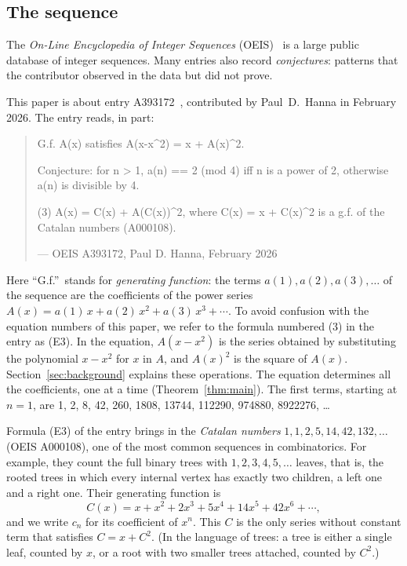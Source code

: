 \documentclass[11pt,a4paper]{article}
\theoremstyle{definition}
\theoremstyle{remark}
\begin{document}
\subsection{The sequence}\label{sec:sequence}
The \emph{On-Line Encyclopedia of Integer Sequences} (OEIS)~\cite{oeisdb} is a large public database of integer
sequences. Many
entries also record \emph{conjectures}: patterns that the contributor observed in the data but did not prove.

This paper is about entry A393172~\cite{oeis}, contributed by Paul~D.~Hanna in February 2026. The entry reads, in part:
\begin{quote}\small\ttfamily\raggedright G.f. A(x) satisfies A(x-x\^{}2) = x + A(x)\^{}2.\par\smallskip Conjecture: for n > 1, a(n) == 2 (mod 4) iff n is a power of 2, otherwise a(n) is divisible by 4.\par\smallskip (3) A(x) = C(x) + A(C(x))\^{}2, where C(x) = x + C(x)\^{}2 is a g.f. of the Catalan numbers (A000108).\par\smallskip\hfill\textrm{--- OEIS A393172, Paul D. Hanna, February 2026}\end{quote}

Here ``G.f.''\ stands for \emph{generating function}: the terms $a(1),a(2),a(3),\dots$ of the sequence are the
coefficients of the power series $A(x)=a(1)\,x+a(2)\,x^2+a(3)\,x^3+\cdots$. To avoid confusion with the equation numbers
of this paper, we refer to the formula numbered (3) in the entry as (E3). In the equation, $A(x-x^2)$ is the series
obtained by substituting the polynomial $x-x^2$ for $x$ in $A$, and $A(x)^2$ is the square of $A(x)$. Section~\ref{sec:background}
explains these operations. The equation determines all the coefficients, one at a time (Theorem~\ref{thm:main}). The
first terms, starting at $n=1$, are 1, 2, 8, 42, 260, 1808, 13744, 112290, 974880, 8922276, \dots

Formula (E3) of the entry brings in the \emph{Catalan numbers} $1,1,2,5,14,42,132,\dots$ (OEIS A000108), one of the most
common sequences in combinatorics. For example, they count the full binary trees with $1,2,3,4,5,\dots$ leaves, that
is, the rooted trees in which every internal vertex has exactly two children, a left one and a right one. Their
generating function is
\[
C(x)=x+x^2+2x^3+5x^4+14x^5+42x^6+\cdots,
\]
and we write $c_n$ for its coefficient of $x^n$. This $C$ is the only series without constant term that satisfies
$C=x+C^2$. (In the language of trees: a tree is either a single leaf, counted by $x$, or a root with two smaller trees
attached, counted by $C^2$.)
\end{document}
